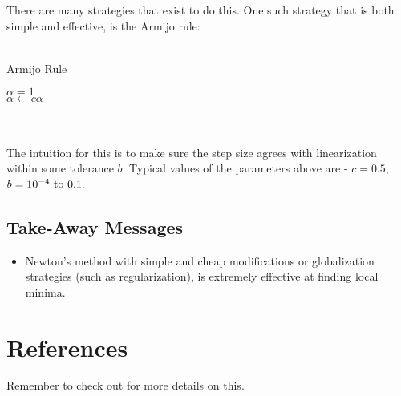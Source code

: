 \noindent
There are many strategies that exist to do this. One such strategy that is both simple and effective, is the Armijo rule: 
\\
\\
\noindent
\begin{algorithm}
	\caption{Armijo Rule}
	\label{alg:armijo}
	\begin{algorithmic}[1]	
        \State $\alpha = 1$  
         \\ 
            \State $\alpha \gets c \alpha$ 
        \EndWhile
	\end{algorithmic}
\end{algorithm}
\\
\\

\noindent
The intuition for this is to make sure the step size agrees with linearization within some tolerance $b$. Typical values of the parameters above are - $c= 0.5$, $b=10^{-4} \ \rm{to} \ 0.1$. 

\subsection{Take-Away Messages}
\begin{itemize}
    \item Newton's method with simple and cheap modifications or globalization strategies  (such as regularization), is extremely effective at finding local minima.
\end{itemize}

\section{References}
Remember to check out \cite{nocedal2006numerical} for more details on this. 

\printbibliography